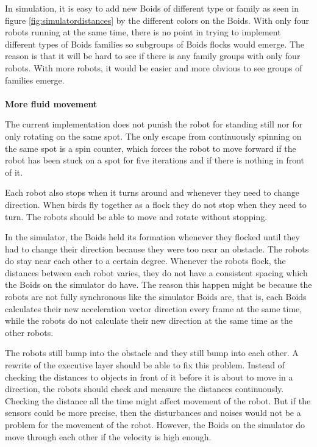 In simulation, it is easy to add new Boids of different type or family as seen in figure \ref{fig:simulatordistances} by the different colors on the Boids. With only four robots running at the same time, there is no point in trying to implement different types of Boids families so subgroups of Boids flocks would emerge. The reason is that it will be hard to see if there is any family groups with only four robots. With more robots, it would be easier and more obvious to see groups of families emerge. \\\\
\textbf{More fluid movement}

The current implementation does not punish the robot for standing still nor for only rotating on the same spot. The only escape from continuously spinning on the same spot is a spin counter, which forces the robot to move forward if the robot has been stuck on a spot for five iterations and if there is nothing in front of it. 

Each robot also stops when it turns around and whenever they need to change direction. When birds fly together as a flock they do not stop when they need to turn. The robots should be able to move and rotate without stopping.

In the simulator, the Boids held its formation whenever they flocked until they had to change their direction because they were too near an obstacle. The robots do stay near each other to a certain degree. Whenever the robots flock, the distances between each robot varies, they do not have a consistent spacing which the Boids on the simulator do have. The reason this happen might be because the robots are not fully synchronous like the simulator Boids are, that is, each Boids calculates their new acceleration vector direction every frame at the same time, while the robots do not calculate their new direction at the same time as the other robots. 

The robots still bump into the obstacle and they still bump into each other. A rewrite of the executive layer should be able to fix this problem. Instead of checking the distances to objects in front of it before it is about to move in a direction, the robots should check and measure the distances continuously. Checking the distance all the time might affect movement of the robot. But if the sensors could be more precise, then the disturbances and noises would not be a problem for the movement of the robot.
However, the Boids on the simulator do move through each other if the velocity is high enough.

